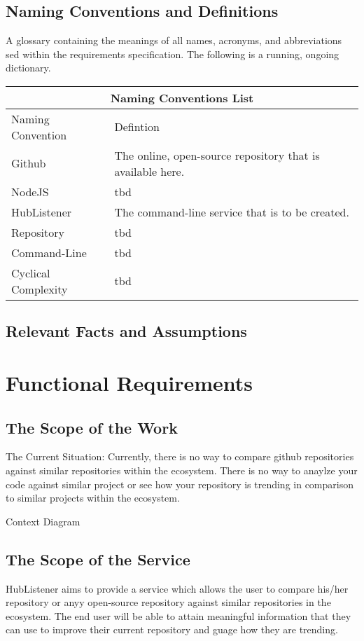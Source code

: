 \documentclass{article}
\begin{document}
\subsection{Naming Conventions and Definitions}

A glossary containing the meanings of all names, acronyms, and abbreviations sed within the requirements specification. The following is a running, ongoing dictionary. 
\newline
\begin{tabular}{ |p{6cm}||p{6cm}|  }
 \hline
 \multicolumn{2}{|c|}{Naming Conventions List} \\
 \hline
 Naming        Convention & Defintion\\
 \hline 
Github & The online, open-source repository that is available here. \\
\hline
NodeJS & tbd \\
\hline
HubListener & The command-line service that is to be created.\\
\hline
Repository & tbd\\
\hline
Command-Line & tbd\\
\hline
Cyclical Complexity & tbd\\
\hline 
\end{tabular}

\subsection{Relevant Facts and Assumptions}

\newpage
\section{Functional Requirements}

\subsection{The Scope of the Work}


The Current Situation: 
Currently, there is no way to compare github repositories against similar repositories within the ecosystem. There is no way to anaylze your code against similar project or see how your repository is trending in comparison to similar projects within the ecosystem. 


Context Diagram 

\subsection{The Scope of the Service}
HubListener aims to provide a service which allows the user to compare his/her repository or anyy open-source repository against similar repositories in the ecosystem. The end user will  be able to attain meaningful information that they can use to improve their current repository and guage how they are trending. 
\newline
\end{document}
